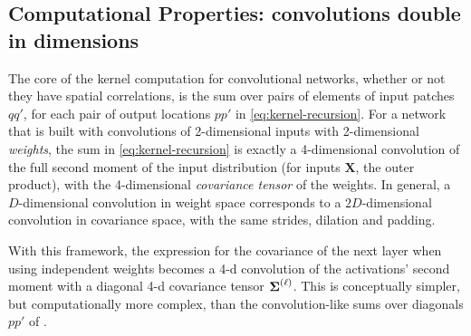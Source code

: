 \documentclass[tablecaption=bottom,wcp,nonatbib]{jmlr} %
\newcommand{\vX}{\mathbf{X}}
\begin{document}
\subsection{Computational Properties: convolutions double in dimensions}


The core of the kernel computation for convolutional networks, whether or not they have spatial correlations, is the sum over pairs of elements of input patches $qq'$, for each pair of output locations $pp'$ in \cref{eq:kernel-recursion}. For a network that is built with convolutions of 2-dimensional inputs with 2-dimensional \emph{weights}, the sum in \ref{eq:kernel-recursion} is exactly a 4-dimensional convolution of the full second moment of the input distribution (for inputs $\vX$, the outer product), with the 4-dimensional \emph{covariance tensor} of the weights. In general, a $D$-dimensional convolution in weight space corresponds to a $2D$-dimensional convolution in covariance space, with the same strides, dilation and padding.

With this framework, the expression for the covariance of the next layer when using independent weights becomes a 4-d convolution of the activations' second moment with a diagonal 4-d covariance tensor $\boldsymbol{\Sigma}^{(\ell)}$. This is conceptually simpler, but computationally more complex, than the convolution-like sums over diagonals $pp'$ of \citet{arora2019exact}.
\end{document}
